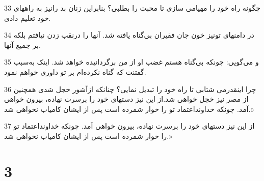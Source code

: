 \par 33 چگونه راه خود را مهیامی سازی تا محبت را بطلبی؟ بنابراین زنان بد رانیز به راههای خود تعلیم دادی.
\par 34 در دامنهای تونیز خون جان فقیران بی‌گناه یافته شد. آنها را درنقب زدن نیافتم بلکه بر جمیع آنها.
\par 35 و می‌گویی: چونکه بی‌گناه هستم غضب او از من برگردانیده خواهد شد. اینک به‌سبب گفتنت که گناه نکرده‌ام بر تو داوری خواهم نمود.
\par 36 چرا اینقدرمی شتابی تا راه خود را تبدیل نمایی؟ چنانکه ازآشور خجل شدی همچنین از مصر نیز خجل خواهی شد.از این نیز دستهای خود را برسرت نهاده، بیرون خواهی آمد. چونکه خداونداعتماد تو را خوار شمرده است پس از ایشان کامیاب نخواهی شد.»
\par 37 از این نیز دستهای خود را برسرت نهاده، بیرون خواهی آمد. چونکه خداونداعتماد تو را خوار شمرده است پس از ایشان کامیاب نخواهی شد.»
 
\chapter{3}

